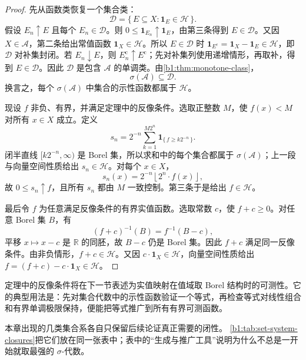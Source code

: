 \begin{proof}
先从函数类恢复一个集合类：
\[
\mathcal D
=\{\,E\subseteq X:\mathbf 1_E\in\mathcal H\,\}.
\]
假设 \(E_n\uparrow E\) 且每个 \(E_n\in\mathcal D\)。则
\(
0\leq\mathbf 1_{E_n}\uparrow\mathbf 1_E
\)，由第三条得到 \(E\in\mathcal D\)。又因 \(X\in\mathcal A\)，第二条给出常值函数 \(\mathbf 1_X\in\mathcal H\)。所以 \(E\in\mathcal D\) 时
\(
\mathbf 1_{E^{\mathrm c}}=\mathbf 1_X-\mathbf 1_E\in\mathcal H
\)，即 \(\mathcal D\) 对补集封闭。若 \(E_n\downarrow E\)，则 \(E_n^{\mathrm c}\uparrow E^{\mathrm c}\)；先对补集列使用递增情形，再取补，得到 \(E\in\mathcal D\)。因此 \(\mathcal D\) 是包含 \(\mathcal A\) 的单调类。由\cref{b1:thm:monotone-class}，
\[
\sigma(\mathcal A)\subseteq\mathcal D.
\]
换言之，每个 \(\sigma(\mathcal A)\) 中集合的示性函数都属于 \(\mathcal H\)。

现设 \(f\) 非负、有界，并满足定理中的反像条件。选取正整数 \(M\)，使 \(f(x)<M\) 对所有 \(x\in X\) 成立。定义
\[
s_n
=2^{-n}\sum_{k=1}^{M2^n}
\mathbf 1_{\{\,f\geq k2^{-n}\,\}}.
\]
闭半直线 \([k2^{-n},\infty)\) 是 Borel 集，所以求和中的每个集合都属于 \(\sigma(\mathcal A)\)；上一段与向量空间性质给出 \(s_n\in\mathcal H\)。对每个 \(x\in X\)，
\[
s_n(x)=2^{-n}\left\lfloor2^n\cdot f(x)\right\rfloor,
\]
故 \(0\leq s_n\uparrow f\)，且所有 \(s_n\) 都由 \(M\) 一致控制。第三条于是给出 \(f\in\mathcal H\)。

最后令 \(f\) 为任意满足反像条件的有界实值函数。选取常数 \(c\)，使 \(f+c\geq0\)。对任意 Borel 集 \(B\)，有
\[
(f+c)^{-1}(B)=f^{-1}(B-c),
\]
平移 \(x\mapsto x-c\) 是 \(\mathbb R\) 的同胚，故 \(B-c\) 仍是 Borel 集。因此 \(f+c\) 满足同一反像条件。由非负情形，\(f+c\in\mathcal H\)。又因 \(c\cdot\mathbf 1_X\in\mathcal H\)，向量空间性质给出
\(
f=(f+c)-c\cdot\mathbf 1_X\in\mathcal H
\)。
\end{proof}

定理中的反像条件将在下一节表述为实值映射在值域取 Borel 结构时的可测性。它的典型用法是：先对集合代数中的示性函数验证一个等式，再检查等式对线性组合和有界单调极限保持，便能把等式推广到所有有界可测函数。

\ProseParagraphBreak

本章出现的几类集合系各自只保留后续论证真正需要的闭性。
\cref{b1:tab:set-system-closures}把它们放在同一张表中；表中的“生成与推广工具”说明为什么不总是一开始就取最强的 \(\sigma\)-代数。



